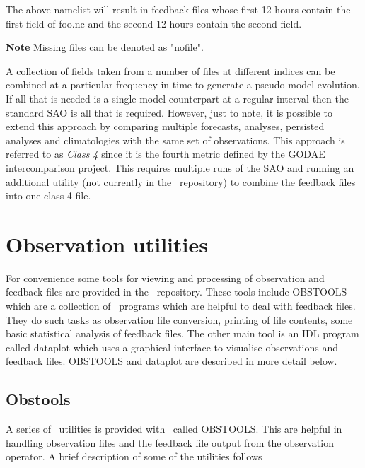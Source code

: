 \documentclass[../main/NEMO_manual]{subfiles}
\begin{document}
The above namelist will result in feedback files whose first 12 hours contain the first field of foo.nc and
the second 12 hours contain the second field.

\textbf{Note} Missing files can be denoted as "nofile".

A collection of fields taken from a number of files at different indices can be combined at
a particular frequency in time to generate a pseudo model evolution.
If all that is needed is a single model counterpart at a regular interval then
the standard SAO is all that is required.
However, just to note, it is possible to extend this approach by comparing multiple forecasts, analyses, persisted analyses and
climatologies with the same set of observations.
This approach is referred to as \emph{Class 4} since it is the fourth metric defined by the GODAE intercomparison project. This requires multiple runs of the SAO and running an additional utility (not currently in the \NEMO\ repository) to combine the feedback files into one class 4 file.

\section{Observation utilities}
\label{sec:OBS_obsutils}

For convenience some tools for viewing and processing of observation and feedback files are provided in
the \NEMO\ repository.
These tools include OBSTOOLS which are a collection of \fortran\ programs which are helpful to deal with feedback files.
They do such tasks as observation file conversion, printing of file contents,
some basic statistical analysis of feedback files.
The other main tool is an IDL program called dataplot which uses a graphical interface to
visualise observations and feedback files.
OBSTOOLS and dataplot are described in more detail below.

\subsection{Obstools}

A series of \fortran\ utilities is provided with \NEMO\ called OBSTOOLS.
This are helpful in handling observation files and the feedback file output from the observation operator. A brief description of some of the utilities follows
\end{document}
